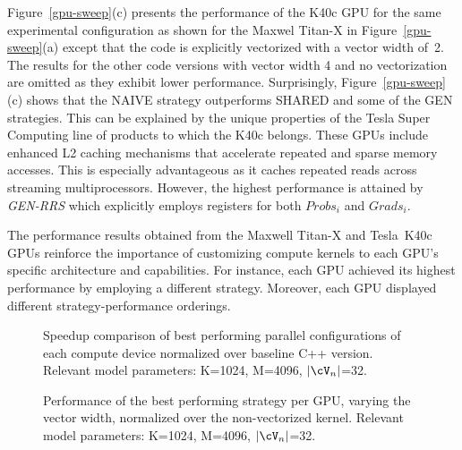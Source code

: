 \begin{comment}
\begin{figure*}[tb]	%
  \centering
  \epsfig{file=plots/k40-1024-strategies-w2.eps, width=\textwidth}
  \caption{Execution time of 1000 \textit{update\_phi} invocations using the K40c GPU, with
  explicit kernel vectorization of width 2, across a sweep of
  \textit{update\_phi} thread block
  sizes. Relevant model parameters: K=1024, M=4096, $|\Neighbors|$=32.}
  \label{k40-w2-sweep}
\end{figure*}
\end{comment}

Figure~\ref{gpu-sweep}(c) presents the performance of the K40c GPU
for the same experimental configuration as shown for the Maxwel \mbox{Titan-X} in
Figure~\ref{gpu-sweep}(a) except that the code
is explicitly vectorized with a vector width of~2. The results
for the other code versions with vector width 4 and no vectorization are
omitted as they exhibit lower performance.
%
Surprisingly, Figure~\ref{gpu-sweep}(c) shows that the NAIVE strategy
outperforms SHARED and some of the GEN strategies. This can be explained by the
unique properties of the Tesla Super Computing line of products to which the
K40c belongs. These GPUs include enhanced L2 caching mechanisms that
accelerate repeated and sparse memory accesses. This is especially advantageous
as it caches repeated reads across streaming multiprocessors. However, the
highest performance is attained by \textit{GEN-RRS} which explicitly employs
registers for both $Probs_i$ and $Grads_i$.

The performance results obtained from the Maxwell \mbox{Titan-X} and Tesla~K40c GPUs
reinforce the importance of customizing compute kernels to each GPU's specific
architecture and capabilities. For instance, each GPU achieved its highest
performance by employing a different strategy. Moreover, each GPU displayed
different strategy-performance orderings.

\begin{figure}[tb]	%
  \centering
  \caption{Speedup comparison of best performing parallel configurations of
  each compute device normalized over baseline C++ version. Relevant model
  parameters: K=1024, M=4096, $|\Neighbors|$=32.}
  \label{gpus-fig}
\end{figure}

\begin{figure}[tb]	%
  \centering
  \caption{Performance of the best performing strategy per GPU, varying the
  vector width, normalized over the non-vectorized kernel. Relevant model
  parameters: K=1024, M=4096, $|\Neighbors|$=32.}
  \label{gpus-v-sweep}
\end{figure}

